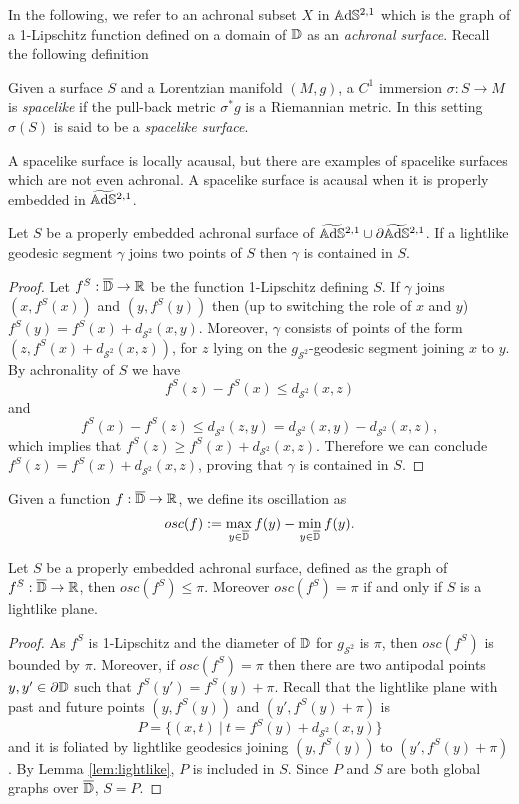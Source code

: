 In the following, we refer to an achronal subset $X$ in $\mathbb{A}\mathrm{d}\mathbb{S}^{2,1}$ which is the graph of a 1-Lipschitz function defined on a domain of $\mathbb{D}$ as an \textit{achronal surface}. Recall the following definition
\begin{definition}
    Given a surface $S$ and a Lorentzian manifold $(M,g)$, a $C^1$ immersion $\sigma : S \to M$ is \textit{spacelike} if the pull-back metric $\sigma^* g$ is a Riemannian metric. In this setting $\sigma(S)$ is said to be a \textit{spacelike surface}.
\end{definition}
A spacelike surface is locally acausal, but there are examples of spacelike surfaces which are not even achronal. A spacelike surface is acausal when it is properly embedded in $\widetilde{\mathbb{A}\mathrm{d}\mathbb{S}}{}^{2,1}$. 
\begin{lemma}\label{lem:lightlike}
    Let $S$ be a properly embedded achronal surface of $\widetilde{\mathbb{A}\mathrm{d}\mathbb{S}}{}^{2,1} \cup \partial\widetilde{\mathbb{A}\mathrm{d}\mathbb{S}}{}^{2,1}$. If a lightlike geodesic segment $\gamma$ joins two points of $S$ then $\gamma$ is contained in $S$.
\end{lemma}
\begin{proof}
    Let $f^S:\overline{\mathbb{D}} \to \mathbb{R}$ be the function 1-Lipschitz defining $S$. If $\gamma$ joins $(x,f^S(x))$ and $(y,f^S(y))$ then (up to switching the role of $x$ and $y$) $f^S(y) = f^S(x) + d_{\mathcal{S}^2}(x,y)$. Moreover, $\gamma$ consists of points of the form $(z,f^S(x) + d_{\mathcal{S}^2}(x,z))$, for $z$ lying on the $g_{\mathcal{S}^2}$-geodesic segment joining $x$ to $y$. By achronality of $S$ we have
    \[
        f^S(z) - f^S(x) \leq d_{\mathcal{S}^2}(x,z)
    \]
    and 
    \[
        f^S(x) - f^S(z) \leq d_{\mathcal{S}^2}(z,y) = d_{\mathcal{S}^2}(x,y) - d_{\mathcal{S}^2}(x,z),
    \]
    which implies that $f^S(z) \geq f^S(x) + d_{\mathcal{S}^2}(x,z)$. Therefore we can conclude $f^S(z) = f^S(x) + d_{\mathcal{S}^2}(x,z)$, proving that $\gamma$ is contained in $S$.
\end{proof}
Given a function $f: \overline{\mathbb{D}}\to\mathbb{R}$, we define its oscillation as 
\[
    osc(f):= \max_{y\in\overline{\mathbb{D}}} f(y) - \min_{y\in\overline{\mathbb{D}}} f(y).
\]
\begin{lemma}\label{lem:osc}
    Let $S$ be a properly embedded achronal surface, defined as the graph of $f^S:\overline{\mathbb{D}} \to \mathbb{R}$, then $osc(f^S) \leq \pi$. Moreover $osc(f^S)= \pi$ if and only if $S$ is a lightlike plane.
\end{lemma}
\begin{proof}
    As $f^S$ is 1-Lipschitz and the diameter of $\mathbb{D}$ for $g_{\mathcal{S}^2}$ is $\pi$, then $osc(f^S)$ is bounded by $\pi$. Moreover, if $osc(f^S)=\pi$ then there are two antipodal points $y,y'\in \partial \mathbb{D}$ such that $f^S(y')=f^S(y) + \pi$. Recall that the lightlike plane with past and future points $(y,f^S(y))$ and $(y',f^S(y)+\pi)$ is
    \[
        P = \{ (x,t) \ | \ t=f^S(y) + d_{\mathcal{S}^2}(x,y) \}
    \]
    and it is foliated by lightlike geodesics joining $(y,f^S(y))$ to $(y',f^S(y)+\pi)$. By Lemma \ref{lem:lightlike}, $P$ is included in $S$. Since $P$ and $S$ are both global graphs over $\overline{\mathbb{D}}$, $S=P$.
\end{proof}
    


